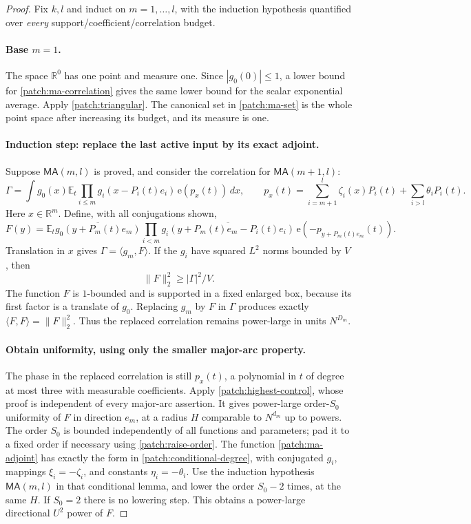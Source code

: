 \documentclass[11pt]{article}
\theoremstyle{definition}
\newcommand{\ee}[1]{\mathrm e\!\left(#1\right)}
\begin{document}
\begin{proof}
Fix $k,l$ and induct on $m=1,\ldots,l$, with the induction hypothesis quantified over
\emph{every} support/coefficient/correlation budget.

\paragraph{Base $m=1$.}
The space $\mathbb R^0$ has one point and measure one.  Since $|g_0(0)|\leq1$, a lower
bound for \eqref{patch:ma-correlation} gives the same lower bound for the scalar exponential
average.  Apply \cref{patch:triangular}.  The canonical set in \eqref{patch:ma-set} is the
whole point space after increasing its budget, and its measure is one.

\paragraph{Induction step: replace the last active input by its exact adjoint.}
Suppose $\mathsf{MA}(m,l)$ is proved, and consider the correlation for $\mathsf{MA}(m+1,l)$:
\[
 \Gamma=\int g_0(x)\mathbb E_t\prod_{i\leq m}g_i(x-P_i(t)e_i)\,
          \ee{p_x(t)}\,dx,\qquad
 p_x(t)=\sum_{i=m+1}^l\zeta_i(x)P_i(t)+\sum_{i>l}\theta_iP_i(t).
\]
Here $x\in\mathbb R^m$.  Define, with all conjugations shown,
\[
 \label{patch:ma-adjoint}
 F(y)=\mathbb E_t\overline{g_0(y+P_m(t)e_m)}
     \prod_{i<m}\overline{g_i(y+P_m(t)e_m-P_i(t)e_i)}\,
               \ee{-p_{y+P_m(t)e_m}(t)}.
 \tag{\theequation}
\]
Translation in $x$ gives $\Gamma=\langle g_m,F\rangle$.
If the $g_i$ have squared $L^2$ norms bounded by $V$, then
\[
 \|F\|_2^2\geq |\Gamma|^2/V.
\]
The function $F$ is $1$-bounded and is supported in a fixed enlarged box, because its first
factor is a translate of $g_0$.  Replacing $g_m$ by $F$ in $\Gamma$ produces exactly
$\langle F,F\rangle=\|F\|_2^2$.  Thus the replaced correlation remains power-large in
units $N^{D_m}$.

\paragraph{Obtain uniformity, using only the smaller major-arc property.}
The phase in the replaced correlation is still $p_x(t)$, a polynomial in $t$ of degree at
most three with measurable coefficients.  Apply \cref{patch:highest-control}, whose proof
is independent of every major-arc assertion.  It gives power-large order-$S_0$ uniformity
of $F$ in direction $e_m$, at a radius $H$ comparable to $N^{d_m}$ up to powers.
The order $S_0$ is bounded independently of all functions and parameters; pad it to a fixed
order if necessary using \eqref{patch:raise-order}.
The function \eqref{patch:ma-adjoint} has exactly the form in
\cref{patch:conditional-degree}, with conjugated $g_i$, mappings $\xi_i=-\zeta_i$, and
constants $\eta_i=-\theta_i$.
Use the induction hypothesis $\mathsf{MA}(m,l)$ in that conditional lemma, and lower the
order $S_0-2$ times, at the same $H$.  If $S_0=2$ there is no lowering step.
This obtains a power-large directional $U^2$ power of $F$.


\end{proof}
\end{document}
